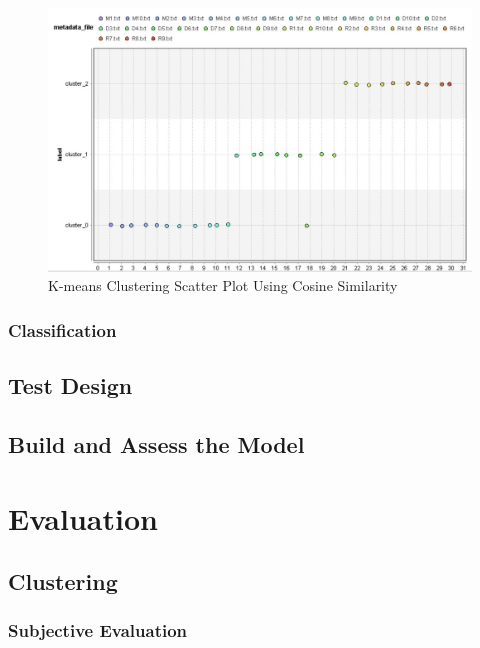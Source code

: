 \begin{figure}[ht]
	\begin{center}
		\advance\leftskip-3cm
		\advance\rightskip-3cm
		\includegraphics[keepaspectratio=true,scale=0.6]{__resources/kmeans2.JPG}
		\caption{K-means Clustering Scatter Plot Using Cosine Similarity}
		\label{stop}
	\end{center}
\end{figure} 



\subsubsection*{Classification}

\subsection*{Test Design}

\subsection*{Build and Assess the Model}


\section*{Evaluation}

\subsection*{Clustering}
\subsubsection*{Subjective Evaluation}
